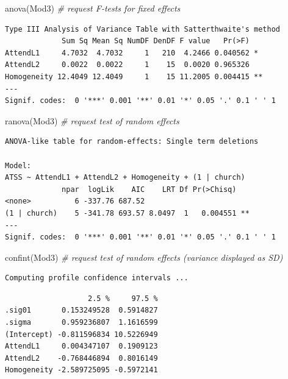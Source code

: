 \documentclass[
  english,
]{book}
\newenvironment{Shaded}{\begin{snugshade}}{\end{snugshade}}
\newcommand{\CommentTok}[1]{\textcolor[rgb]{0.56,0.35,0.01}{\textit{#1}}}
\newcommand{\FunctionTok}[1]{\textcolor[rgb]{0.00,0.00,0.00}{#1}}
\newcommand{\NormalTok}[1]{#1}
\begin{document}
\begin{Shaded}
\begin{Highlighting}[]
\FunctionTok{anova}\NormalTok{(Mod3) }\CommentTok{\# request F{-}tests for fixed effects}
\end{Highlighting}
\end{Shaded}

\begin{verbatim}
Type III Analysis of Variance Table with Satterthwaite's method
             Sum Sq Mean Sq NumDF DenDF F value   Pr(>F)   
AttendL1     4.7032  4.7032     1   210  4.2466 0.040562 * 
AttendL2     0.0022  0.0022     1    15  0.0020 0.965326   
Homogeneity 12.4049 12.4049     1    15 11.2005 0.004415 **
---
Signif. codes:  0 '***' 0.001 '**' 0.01 '*' 0.05 '.' 0.1 ' ' 1
\end{verbatim}

\begin{Shaded}
\begin{Highlighting}[]
\FunctionTok{ranova}\NormalTok{(Mod3) }\CommentTok{\# request test of random effects}
\end{Highlighting}
\end{Shaded}

\begin{verbatim}
ANOVA-like table for random-effects: Single term deletions

Model:
ATSS ~ AttendL1 + AttendL2 + Homogeneity + (1 | church)
             npar  logLik    AIC    LRT Df Pr(>Chisq)   
<none>          6 -337.76 687.52                        
(1 | church)    5 -341.78 693.57 8.0497  1   0.004551 **
---
Signif. codes:  0 '***' 0.001 '**' 0.01 '*' 0.05 '.' 0.1 ' ' 1
\end{verbatim}

\begin{Shaded}
\begin{Highlighting}[]
\FunctionTok{confint}\NormalTok{(Mod3) }\CommentTok{\# request test of random effects (variance displayed as SD)}
\end{Highlighting}
\end{Shaded}

\begin{verbatim}
Computing profile confidence intervals ...
\end{verbatim}

\begin{verbatim}
                   2.5 %     97.5 %
.sig01       0.153249528  0.5914827
.sigma       0.959236807  1.1616599
(Intercept) -0.811596834 10.5226949
AttendL1     0.004347107  0.1909123
AttendL2    -0.768446894  0.8016149
Homogeneity -2.589725095 -0.5972141
\end{verbatim}
\end{document}
